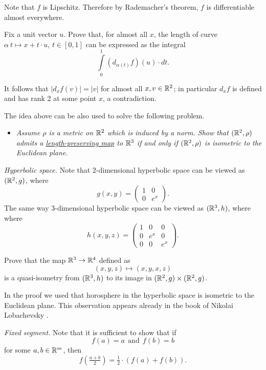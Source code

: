 Note that $f$ is Lipschitz.
Therefore by Rademacher's theorem, $f$ is differentiable almost everywhere.

Fix a unit vector $u$.
Prove that, for almost all $x$, the length of curve 
$\alpha\:t\mapsto x+t\cdot u$, $t\in[0,1]$ can be expressed as the integral
\[\int\limits_0^1 (d_{\alpha(t)}f)(u) \cdot dt.\]

It follows that $|d_xf(v)|=|v|$ for almost all $x,v\in\mathbb{R}^2$;
in particular $d_xf$ is defined and has rank 2 at some point $x$, a contradiction.  

The idea above can be also used to solve the following problem.

\begin{itemize}
\item {\it Assume $\rho$ is a metric on $\mathbb{R}^2$ 
which is induced by a norm.
Show that $(\mathbb{R}^2,\rho)$ admits 
a \hyperref[Length-preserving map]{\emph{length-preserving map}} 
to $\mathbb{R}^3$ 
if and only if 
$(\mathbb{R}^2,\rho)$ is isometric to the Euclidean plane.}
\end{itemize}




\textit{Hyperbolic space.}
Note that $2$-dimensional hyperbolic space 
can be viewed as $(\mathbb{R}^2,g)$, where 
\[g(x,y)=\left(\begin{matrix}
     1&0
     \\
     0&e^{x}
    \end{matrix}\right).\]
The same way $3$-dimensional hyperbolic space 
can be viewed as $(\mathbb{R}^3,h)$, where 
where 
\[h(x,y,z)=\left(\begin{matrix}
     1&0&0
     \\
     0&e^{x}&0
     \\
     0&0&e^{x}
    \end{matrix}\right).\]

Prove that the map $\mathbb{R}^3\to \mathbb{R}^4$ defined as
$$(x,y,z)\mapsto (x,y,x,z)$$
is a quasi-isometry from $(\mathbb{R}^3,h)$ to its image in $(\mathbb{R}^2,g)\times (\mathbb{R}^2,g)$.

In the proof we used that horosphere in the hyperbolic space is isometric to the Euclidean plane.
This observation appears already in the book of Nikolai Lobachevsky \cite[see 34 in][]{lobachevsky}.



\textit{Fixed segment.}
Note that it is sufficient to show that 
if 
\[f(a)=a\ \ \text{and}\ \ f(b)=b\]
for some $a,b\in\mathbb{R}^m$,
then 
\[f(\tfrac{a+b}2)=\tfrac12\cdot(f(a)+f(b)).\]

